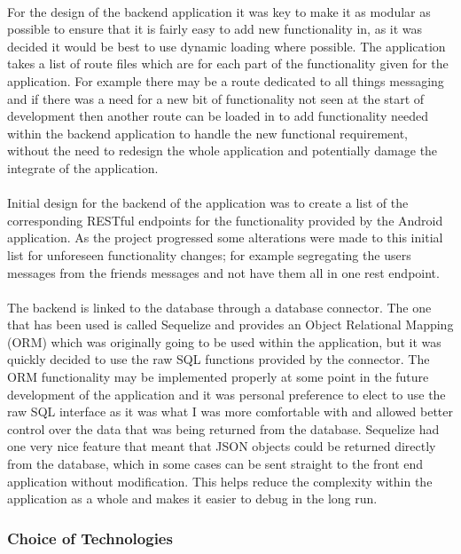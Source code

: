 \\
For the design of the backend application it was key to make it as modular as possible to ensure that it is fairly easy to add new functionality in, as it was decided it would be best to use dynamic loading where possible. The application takes a list of route files which are for each part of the functionality given for the application. For example there may be a route dedicated to all things messaging and if there was a need for a new bit of functionality not seen at the start of development then another route can be loaded in to add functionality needed within the backend application to handle the new functional requirement, without the need to redesign the whole application and potentially damage the integrate of the application.\\
\\
Initial design for the backend of the application was to create a list of the corresponding RESTful endpoints for the functionality provided by the Android application. As the project progressed some alterations were made to this initial list for unforeseen functionality changes; for example segregating the users messages from the friends messages and not have them all in one rest endpoint.\\
\\
The backend is linked to the database through a database connector. The one that has been used is called Sequelize \cite{SaschaDepold:Sequelize:2015:online} and provides an Object Relational Mapping (ORM) which was originally going to be used within the application, but it was quickly decided to use the raw SQL functions provided by the connector. The ORM functionality may be implemented properly at some point in the future development of the application and it was personal preference to elect to use the raw SQL interface as it was what I was more comfortable with and allowed better control over the data that was being returned from the database. Sequelize had one very nice feature that meant that JSON objects could be returned directly from the database, which in some cases can be sent straight to the front end application without modification. This helps reduce the complexity within the application as a whole and makes it easier to debug in the long run.

\subsubsection*{Choice of Technologies}
\label{sec:node_choice_of_tech}

